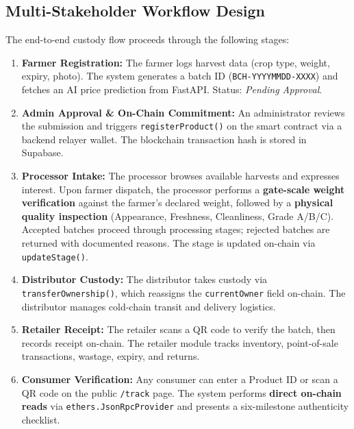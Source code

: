 \documentclass[conference]{IEEEtran}
\begin{document}
\subsection{Multi-Stakeholder Workflow Design}
The end-to-end custody flow proceeds through the following stages:
\begin{enumerate}
    \item \textbf{Farmer Registration:} The farmer logs harvest data (crop type, weight, expiry, photo). The system generates a batch ID (\texttt{BCH-YYYYMMDD-XXXX}) and fetches an AI price prediction from FastAPI. Status: \textit{Pending Approval}.
    \item \textbf{Admin Approval \& On-Chain Commitment:} An administrator reviews the submission and triggers \texttt{registerProduct()} on the smart contract via a backend relayer wallet. The blockchain transaction hash is stored in Supabase.
    \item \textbf{Processor Intake:} The processor browses available harvests and expresses interest. Upon farmer dispatch, the processor performs a \textbf{gate-scale weight verification} against the farmer's declared weight, followed by a \textbf{physical quality inspection} (Appearance, Freshness, Cleanliness, Grade A/B/C). Accepted batches proceed through processing stages; rejected batches are returned with documented reasons. The stage is updated on-chain via \texttt{updateStage()}.
    \item \textbf{Distributor Custody:} The distributor takes custody via \texttt{transferOwnership()}, which reassigns the \texttt{currentOwner} field on-chain. The distributor manages cold-chain transit and delivery logistics.
    \item \textbf{Retailer Receipt:} The retailer scans a QR code to verify the batch, then records receipt on-chain. The retailer module tracks inventory, point-of-sale transactions, wastage, expiry, and returns.
    \item \textbf{Consumer Verification:} Any consumer can enter a Product ID or scan a QR code on the public \texttt{/track} page. The system performs \textbf{direct on-chain reads} via \texttt{ethers.JsonRpcProvider} and presents a six-milestone authenticity checklist.
\end{enumerate}
\end{document}
